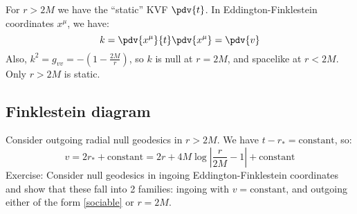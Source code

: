 \documentclass{jknotes}
\begin{document}
For \(r>2M\) we have the ``static'' KVF \(\pdv{t}\). In Eddington-Finklestein coordinates \(x^\mu\), we have:
\begin{equation}
    k = \pdv{x^\mu}{t}\pdv{x^\mu} = \pdv{v}
\end{equation}
Also, \(k^2 = g_{vv} = -\left( 1-\frac{2M}{r} \right)\), so \(k\) is null at \(r=2M\), and spacelike at \(r < 2M\). Only \(r > 2M\) is static.

\subsection{Finklestein diagram}
Consider outgoing radial null geodesics in \(r>2M\). We have \(t-r_*= \text{constant}\), so:
\begin{equation}
    v = 2r_* + \text{constant}
    = 2r + 4M\log\left|\frac{r}{2M}-1\right| + \text{constant}
    \tag{\(*\)}
    \label{sociable}
\end{equation}
Exercise: Consider null geodesics in ingoing Eddington-Finklestein coordinates and show that these fall into 2 families: ingoing with \(v = \text{constant}\), and outgoing either of the form \eqref{sociable} or \(r=2M\). 
\end{document}
